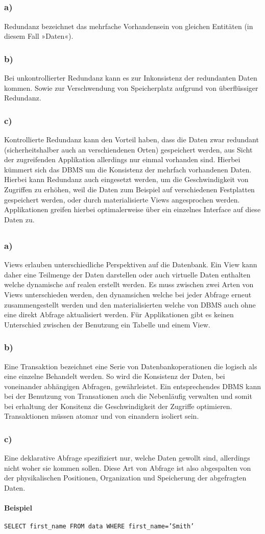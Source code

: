 \documentclass[12pt,a4paper,DIV=9]{scrartcl}
\newcounter{temp}
\newcommand{\aufgabe}[1]{
  \setcounter{temp}{\value{subsection}}
  \setcounter{subsection}{#1}
  \addtocounter{subsection}{-1}
  \subsection{}
  \setcounter{subsection}{\value{temp}}
}
\newcommand{\teil}[2][]{
  \subsubsection*{#2) #1}
}
\begin{document}
\aufgabe{3}
\teil{a}
  Redundanz bezeichnet das mehrfache Vorhandensein von gleichen Entitäten (in diesem Fall »Daten«).
\teil{b}
  Bei unkontrollierter Redundanz kann es zur Inkonsistenz der redundanten Daten kommen. Sowie zur Verschwendung von Speicherplatz aufgrund von überflüssiger Redundanz.

\teil{c}
  Kontrollierte Redundanz kann den Vorteil haben, dass die Daten zwar redundant (sicherheitshalber auch an verschiendenen Orten) gespeichert werden, aus Sicht der zugreifenden Applikation allerdings nur einmal vorhanden sind. Hierbei kümmert sich das DBMS um die Konsistenz der mehrfach vorhandenen Daten. 
  Hierbei kann Redundanz auch eingesetzt werden, um die Geschwindigkeit von Zugriffen zu erhöhen, weil die Daten zum Beispiel auf verschiedenen Festplatten gespeichert werden, oder durch materialisierte Views angesprochen werden.
  Applikationen greifen hierbei optimalerweise über ein einzelnes Interface auf diese Daten zu.

\aufgabe{4}
\teil{a}
  Views erlauben unterschiedliche Perspektiven auf die Datenbank. Ein View kann daher eine Teilmenge  der Daten darstellen oder auch virtuelle Daten enthalten welche dynamische auf realen erstellt werden. Es muss zwischen zwei Arten von Views unterschieden werden, den dynamsichen welche bei jeder Abfrage erneut zusammengestellt werden und den materialisierten welche von DBMS auch ohne eine direkt Abfrage aktualisiert werden. Für Applikationen gibt es keinen Unterschied zwischen der Benutzung ein Tabelle und einem View. 

\teil{b}
  Eine Transaktion bezeichnet eine Serie von Datenbankoperationen die logisch als eine einzelne Behandelt werden. So wird die Konsistenz der Daten, bei voneinander abhängigen Abfragen, gewährleistet. Ein entsprechendes DBMS kann bei der Benutzung von Transationen auch die Nebenläufig verwalten und somit bei erhaltung der Konsitenz die Geschwindigkeit der Zugriffe optimieren. Transaktionen müssen atomar und von einandern isoliert sein.

\teil{c}
  Eine deklarative Abfrage spezifiziert nur, welche Daten gewollt sind, allerdings nicht woher sie kommen sollen. Diese Art von Abfrage ist also abgespalten von der physikalischen Positionen, Organization und Speicherung der abgefragten Daten.

\paragraph{Beispiel} \texttt{SELECT first\_name FROM data WHERE first\_name='Smith'}
\end{document}
